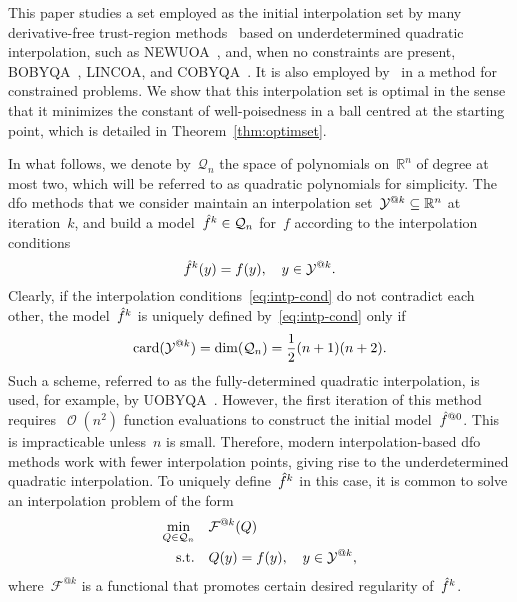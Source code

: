 \documentclass{article}
\makeatletter
\newcounter{cite}
\theoremstyle{definition}
\theoremstyle{plain}
\theoremstyle{remark}
\DeclareMathOperator{\bigo}{\mathcal{O}}
\DeclareMathOperator{\card}{card}
\newcommand*{\obj}{f}
\newcommand*{\objm}[1][]{\hat{\obj}\ifblank{#1}{}{^{#1}}}
\newcommand*{\R}{\mathbb{R}}
\newcommand*{\xpt}[1][]{\mathcal{Y}\ifblank{#1}{}{^{@#1}}}
\newcommand*{\qpoly}{\mathcal{Q}_n}
\makeatother
\begin{document}
This paper studies a set employed as the initial interpolation set by many derivative-free trust-region methods~\cite{Conn_Gould_Toint_2000,Yuan_2015} based on underdetermined quadratic interpolation, such as NEWUOA~\cite{Powell_2006}, and, when no constraints are present, BOBYQA~\cite{Powell_2009}, LINCOA, and COBYQA~\cite{Ragonneau_2022,Ragonneau_Zhang_2023}.
It is also employed by~\cite{Conejo_Karas_Pedroso_2015} in a method for constrained problems.
We show that this interpolation set is optimal in the sense that it minimizes the constant of well-poisedness in a ball centred at the starting point, which is detailed in Theorem~\ref{thm:optimset}.

In what follows, we denote by~$\qpoly$ the space of polynomials on~$\R^n$ of degree at most two, which will be referred to as quadratic polynomials for simplicity.
The \gls{dfo} methods that we consider maintain an interpolation set~$\xpt[k] \subseteq \R^n$ at iteration~$k$, and build a model~$\objm[k] \in \qpoly$ for~$\obj$ according to the interpolation conditions
\begin{equation}
    \label{eq:intp-cond}
    \objm[k](y) = \obj(y), \quad y \in \xpt[k].
\end{equation}
Clearly, if the interpolation conditions~\eqref{eq:intp-cond} do not contradict each other, the model~$\objm[k]$ is uniquely defined by~\eqref{eq:intp-cond} only if
\begin{equation*}
    \card(\xpt[k]) = \dim(\qpoly) = \frac{1}{2} (n + 1) (n + 2).
\end{equation*}
Such a scheme, referred to as the fully-determined quadratic interpolation, is used, for example, by UOBYQA~\cite{Powell_2002}.
However, the first iteration of this method requires~$\bigo(n^2)$ function evaluations to construct the initial model~$\objm[@0]$.
This is impracticable unless~$n$ is small.
Therefore, modern interpolation-based \gls{dfo} methods work with fewer interpolation points, giving rise to the underdetermined quadratic interpolation.
To uniquely define~$\objm[k]$ in this case, it is common to solve an interpolation problem of the form
\begin{equation}
    \label{eq:intp-var}
    \begin{aligned}
        \min_{Q \in \qpoly} & \quad \mathcal{F}^{@k}(Q)\\
        \text{s.t.}         & \quad Q(y) = \obj(y), \quad y \in \xpt[k],
    \end{aligned}
\end{equation}
where~$\mathcal{F}^{@k}$ is a functional that promotes certain desired regularity of~$\objm[k]$.
\end{document}
